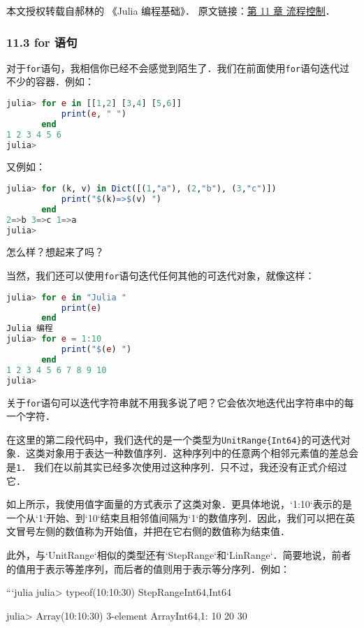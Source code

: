 
本文授权转载自郝林的 《Julia 编程基础》． 原文链接：\href{https://github.com/hyper0x/JuliaBasics/blob/master/book/ch11.md}{第 11 章 流程控制}．


\subsubsection{11.3 for 语句}

对于\verb`for`语句，我相信你已经不会感觉到陌生了．我们在前面使用\verb`for`语句迭代过不少的容器．例如：
\begin{lstlisting}[language=julia]
julia> for e in [[1,2] [3,4] [5,6]]
           print(e, " ")
       end
1 2 3 4 5 6 
julia> 
\end{lstlisting}

又例如：
\begin{lstlisting}[language=julia]
julia> for (k, v) in Dict([(1,"a"), (2,"b"), (3,"c")])
           print("$(k)=>$(v) ")
       end
2=>b 3=>c 1=>a 
julia> 
\end{lstlisting}

怎么样？想起来了吗？

当然，我们还可以使用\verb|for|语句迭代任何其他的可迭代对象，就像这样：
\begin{lstlisting}[language=julia]
julia> for e in "Julia "
           print(e)
       end
Julia 编程
julia> for e = 1:10
           print("$(e) ")
       end
1 2 3 4 5 6 7 8 9 10 
julia> 
\end{lstlisting}

关于\verb|for|语句可以迭代字符串就不用我多说了吧？它会依次地迭代出字符串中的每一个字符．

在这里的第二段代码中，我们迭代的是一个类型为\verb|UnitRange{Int64}|的可迭代对象．这类对象用于表达一种数值序列．这种序列中的任意两个相邻元素值的差总会是\verb`1`．
我们在以前其实已经多次使用过这种序列．只不过，我还没有正式介绍过它．

如上所示，我使用值字面量的方式表示了这类对象．更具体地说，`1:10`表示的是一个从`1`开始、到`10`结束且相邻值间隔为`1`的数值序列．因此，我们可以把在英文冒号左侧的数值称为开始值，并把在它右侧的数值称为结束值．

此外，与`UnitRange`相似的类型还有`StepRange`和`LinRange`．简要地说，前者的值用于表示等差序列，而后者的值则用于表示等分序列．例如：

```julia
julia> typeof(10:10:30)
StepRange{Int64,Int64}

julia> Array(10:10:30)
3-element Array{Int64,1}:
 10
 20
 30

